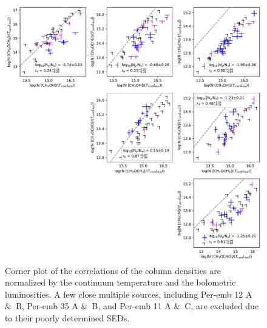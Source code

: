\documentclass[twocolumn]{aastex62}
\begin{document}
\addtocounter{figure}{-1}
\begin{figure}[htbp!]
  \centering
  \includegraphics[width=\textwidth]{corner_Ncol_correlations_norm_Tcont+Lbol.pdf}
  \caption{Corner plot of the correlations of the column densities are normalized by the continuum temperature and the bolometric luminosities.  A few close multiple sources, including Per-emb 12 A \&\ B, Per-emb 35 A \&\ B, and Per-emb 11 A \&\ C, are excluded due to their poorly determined SEDs.}
  \label{fig:corner_tbol}
\end{figure}
\end{document}
